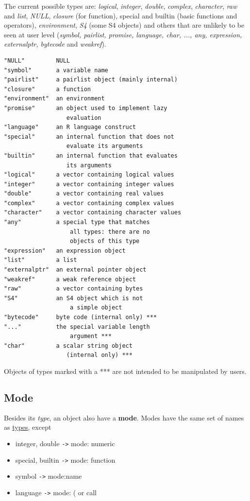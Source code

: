 The current possible types are: {\it logical}, {\it integer}, {\it double},
{\it complex}, {\it character}, {\it raw} and {\it list}, {\it NULL},
{\it closure} (for function), special and builtin (basic functions
and operators), {\it environment}, {\it S4} (some S4 objects) and others
that are unlikely to be seen at user level ({\it symbol, pairlist,
promise, language, char, ..., any, expression,
externalptr, bytecode} and {\it weakref}).

\begin{lstlisting}
"NULL"         NULL
"symbol"       a variable name
"pairlist"     a pairlist object (mainly internal)
"closure"      a function
"environment"  an environment
"promise"      an object used to implement lazy 
                  evaluation
"language"     an R language construct
"special"      an internal function that does not 
                  evaluate its arguments
"builtin"      an internal function that evaluates 
                  its arguments
"logical"      a vector containing logical values
"integer"      a vector containing integer values
"double"       a vector containing real values
"complex"      a vector containing complex values
"character"    a vector containing character values
"any"          a special type that matches 
                   all types: there are no 
                   objects of this type
"expression"   an expression object
"list"         a list
"externalptr"  an external pointer object
"weakref"      a weak reference object
"raw"          a vector containing bytes
"S4"           an S4 object which is not 
                   a simple object
"bytecode"     byte code (internal only) ***
"..."          the special variable length 
                   argument ***
"char"         a scalar string object 
                  (internal only) ***
\end{lstlisting}
Objects of types marked with a *** are not intended to be manipulated
by users.

\subsection{Mode}
\label{sec:mode}

Besides its {\it type}, an object also have a {\bf mode}.  Modes have
the same set of names as \hyperref[sec:type]{types}, except
\begin{itemize}
\item integer, double \verb|->| mode: numeric

\item special, builtin \verb|->| mode: function

\item symbol \verb|->| mode:name

\item language \verb|->| mode: ( or call
\end{itemize}

